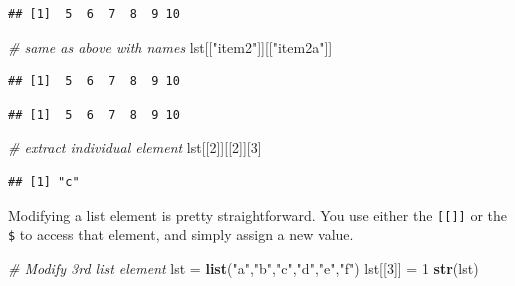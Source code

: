 \documentclass[
]{book}
\newenvironment{Shaded}{\begin{snugshade}}{\end{snugshade}}
\newcommand{\CommentTok}[1]{\textcolor[rgb]{0.56,0.35,0.01}{\textit{#1}}}
\newcommand{\DecValTok}[1]{\textcolor[rgb]{0.00,0.00,0.81}{#1}}
\newcommand{\KeywordTok}[1]{\textcolor[rgb]{0.13,0.29,0.53}{\textbf{#1}}}
\newcommand{\NormalTok}[1]{#1}
\newcommand{\OperatorTok}[1]{\textcolor[rgb]{0.81,0.36,0.00}{\textbf{#1}}}
\newcommand{\StringTok}[1]{\textcolor[rgb]{0.31,0.60,0.02}{#1}}
\begin{document}
\begin{verbatim}
## [1]  5  6  7  8  9 10
\end{verbatim}

\begin{Shaded}
\begin{Highlighting}[]
\CommentTok{# same as above with names}
\NormalTok{lst[[}\StringTok{"item2"}\NormalTok{]][[}\StringTok{"item2a"}\NormalTok{]]}
\end{Highlighting}
\end{Shaded}

\begin{verbatim}
## [1]  5  6  7  8  9 10
\end{verbatim}

\begin{Shaded}
\end{Shaded}

\begin{verbatim}
## [1]  5  6  7  8  9 10
\end{verbatim}

\begin{Shaded}
\begin{Highlighting}[]
\CommentTok{# extract individual element}
\NormalTok{lst[[}\DecValTok{2}\NormalTok{]][[}\DecValTok{2}\NormalTok{]][}\DecValTok{3}\NormalTok{]}
\end{Highlighting}
\end{Shaded}

\begin{verbatim}
## [1] "c"
\end{verbatim}

Modifying a list element is pretty straightforward. You use either the \texttt{{[}{[}{]}{]}} or the \texttt{\$} to access that element, and simply assign a new value.

\begin{Shaded}
\begin{Highlighting}[]
\CommentTok{# Modify 3rd list element}
\NormalTok{lst =}\StringTok{ }\KeywordTok{list}\NormalTok{(}\StringTok{"a"}\NormalTok{,}\StringTok{"b"}\NormalTok{,}\StringTok{"c"}\NormalTok{,}\StringTok{"d"}\NormalTok{,}\StringTok{"e"}\NormalTok{,}\StringTok{"f"}\NormalTok{)}
\NormalTok{lst[[}\DecValTok{3}\NormalTok{]] =}\StringTok{ }\DecValTok{1}
\KeywordTok{str}\NormalTok{(lst)}
\end{Highlighting}
\end{Shaded}
\end{document}

